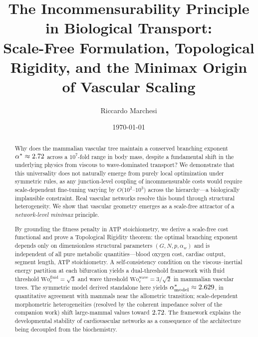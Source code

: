 \documentclass[11pt,a4paper]{article}
\theoremstyle{remark}
\begin{document}


\title{\LARGE\bfseries The Incommensurability Principle in Biological Transport:\\[4pt]
Scale-Free Formulation, Topological Rigidity, and the Minimax Origin of Vascular
Scaling}
\author{Riccardo Marchesi}
\date{\today}

\maketitle

\begin{abstract}
Why does the mammalian vascular tree maintain a conserved branching exponent
$\alpha^* \approx 2.72$ across a $10^7$-fold range in body mass,
despite a fundamental shift in the underlying physics from viscous to
wave-dominated transport? We demonstrate that this universality does not
naturally emerge from purely local optimization under symmetric rules, as any
junction-level coupling of incommensurable costs would require scale-dependent
fine-tuning varying by $O(10^2$--$10^3)$ across the hierarchy---a biologically
implausible constraint. Real vascular networks resolve this bound through
structural heterogeneity. We show that vascular geometry emerges as a scale-free
attractor of a \emph{network-level minimax} principle.
    
By grounding the fitness penalty in ATP stoichiometry, we derive a scale-free
cost functional and prove a Topological Rigidity theorem: the optimal branching
exponent depends only on dimensionless structural parameters $(G, N, p,
\alpha_w)$ and is independent of all pure metabolic quantities---blood oxygen
cost, cardiac output, segment length, ATP stoichiometry. A self-consistency
condition on the viscous--inertial energy partition at each bifurcation yields a
dual-threshold framework with fluid threshold $\mathrm{Wo}_c^{\mathrm{fluid}} =
\sqrt{3}$ and wave threshold $\mathrm{Wo}_c^{\mathrm{wave}} = 3/\sqrt{2}$ in
mammalian vascular trees. The symmetric model derived standalone here
yields $\alpha^*_{\mathrm{model}} \approx 2.629$, in quantitative
agreement with mammals near the allometric transition; scale-dependent
morphometric heterogeneities (resolved by the coherent impedance solver of
the companion work) shift large-mammal values toward $2.72$. The
framework explains the developmental stability of cardiovascular networks as a
consequence of the architecture being decoupled from the biochemistry.
\end{abstract}
\end{document}
